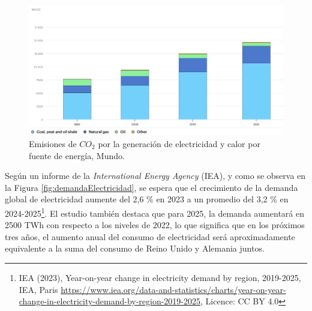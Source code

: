 \begin{figure}[ht]
	\centering
	\includegraphics[width=1\textwidth]{./Figures/co2-emissions-by-electricity-generation.png}
	\caption[Emisiones de $CO_2$ por la generación de electricidad.]{Emisiones de $CO_2$ por la generación de electricidad y calor por fuente de energía, Mundo\footnotemark.}
	\label{fig:emisionesco2}
	
\end{figure}



Según un informe de la \textit{International Energy Agency} (IEA), y como se observa en la Figura \ref{fig:demandaElectricidad}, se espera que el crecimiento de la demanda global de electricidad aumente del 2,6 \% en 2023 a un promedio del 3,2 \% en 2024-2025\footnote{IEA (2023), Year-on-year change in electricity demand by region, 2019-2025, IEA, Paris \url{https://www.iea.org/data-and-statistics/charts/year-on-year-change-in-electricity-demand-by-region-2019-2025}, Licence: CC BY 4.0}. El estudio también destaca que para 2025, la demanda aumentará en 2500 TWh con respecto a los niveles de 2022, lo que significa que en los próximos tres años, el aumento anual del consumo de electricidad será aproximadamente equivalente a la suma del consumo de Reino Unido y Alemania juntos.

